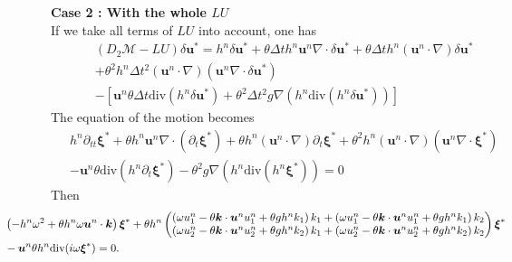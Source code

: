 \documentclass[a4paper, 11pt]{report}
\begin{document}
\noindent \textbf{Case 2 : With the whole $LU$}\\
If we take all terms of $LU$ into account, one has
\begin{equation*}
\begin{split}
&(D_2 \mathcal{M}-LU) \delta \boldsymbol{u}^*=h^n \delta \boldsymbol{u}^*+\theta\Delta th^n\boldsymbol{u}^n\nabla \cdot \delta \boldsymbol{u}^*+\theta\Delta th^n\left(\boldsymbol{u}^n\cdot \nabla \right)\delta \boldsymbol{u}^*\\
&+\theta^2h^n\Delta t^2\left(\boldsymbol{u}^n\cdot \nabla\right)\left(\boldsymbol{u}^n\nabla \cdot \delta \boldsymbol{u}^*\right)\\
&-\left[\boldsymbol{u}^n\theta\Delta t\text{div}(h^n\delta \boldsymbol{u}^*)+\theta^2\Delta t^2g\nabla \left(h^n\text{div}(h^n\delta \boldsymbol{u}^*)\right)\right]
\end{split}
\end{equation*}
The equation of the motion becomes 
\begin{equation*}
\begin{split}
&h^n\partial_{tt}\boldsymbol{\xi}^*+\theta h^n\boldsymbol{u}^n\nabla \cdot \left(\partial_t \boldsymbol{\xi}^*\right)+\theta h^n\left(\boldsymbol{u}^n\cdot \nabla\right)\partial_t \boldsymbol{\xi}^*+\theta^2h^n\left(\boldsymbol{u}^n\cdot \nabla\right)\left(\boldsymbol{u}^n\nabla \cdot \boldsymbol{\xi}^*\right)\\
&-\boldsymbol{u}^n\theta\text{div}(h^n\partial_t\boldsymbol{\xi}^*)-\theta^2g\nabla \left(h^n\text{div}(h^n\boldsymbol{\xi}^*)\right)=0
\end{split}
\end{equation*}
Then
\begin{equation*}
\begin{split}
&\hspace*{-1.5cm}\left(-h^n\omega^2+\theta h^n\omega \boldsymbol{u}^n\cdot \boldsymbol{k}\right)\boldsymbol{\xi}^*+\theta h^n \begin{pmatrix}\left(\omega u_1^n-\theta\boldsymbol{k}\cdot \boldsymbol{u}^n u_1^n+\theta g h^nk_1\right)k_1+\left(\omega u_1^n-\theta\boldsymbol{k}\cdot \boldsymbol{u}^n u_1^n+\theta g h^nk_1\right)k_2 \\
\left(\omega u_2^n-\theta\boldsymbol{k}\cdot \boldsymbol{u}^n u_2^n+\theta g h^nk_2\right)k_1+\left(\omega u_2^n-\theta\boldsymbol{k}\cdot \boldsymbol{u}^n u_2^n+\theta g h^nk_2\right)k_2\end{pmatrix}\boldsymbol{\xi}^*\\
&\hspace*{-1.5cm}-\boldsymbol{u}^n\theta h^n \text{div}(i\omega \boldsymbol{\xi}^*)=0.
\end{split}
\end{equation*}
\end{document}
